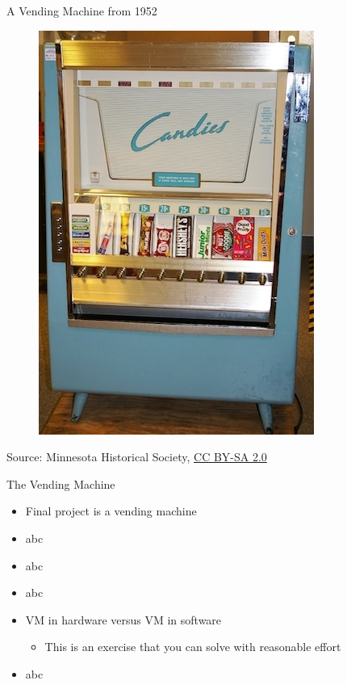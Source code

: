 \documentclass[xcolor=pdflatex,dvipsnames,table]{beamer}
\begin{document}
\begin{frame}[fragile]{A Vending Machine from 1952}
\begin{figure}
    \centering
    \href{https://en.wikipedia.org/wiki/File:CandiesVendingMachine1952.jpg}{\includegraphics[scale=0.4]{CandiesVendingMachine1952}}

\end{figure}

{\tiny Source: Minnesota Historical Society, \href{https://creativecommons.org/licenses/by-sa/2.0}{CC BY-SA 2.0}}
\end{frame}

\begin{frame}[fragile]{The Vending Machine}
\begin{itemize}
\item Final project is a vending machine
\item abc
\item abc
\item abc
\item VM in hardware versus VM in software
\begin{itemize}
\item This is an exercise that you can solve with reasonable effort
\end{itemize}
\item abc
\end{itemize}
\end{frame}
\end{document}

